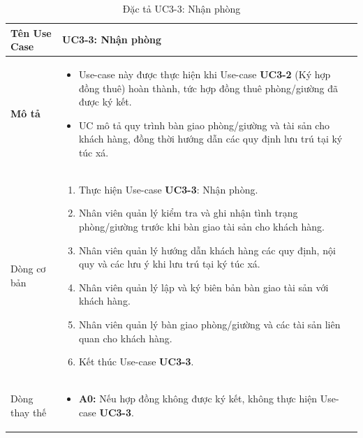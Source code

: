 \noindent
\begin{table}[H]
    \centering
\begin{tabularx}{\textwidth}{|>{\centering\arraybackslash\bfseries}m{3.5cm}|X|}
    \hline
    Tên Use Case & {\centering\textbf{UC3-3: Nhận phòng}\par} \\ 
    \hline

    Mô tả &
    \vspace{0.2cm}
    \begin{itemize}[leftmargin=*, nosep, label=-]
        \item Use-case này được thực hiện khi Use-case \textbf{UC3-2} (Ký hợp đồng thuê) hoàn thành, tức hợp đồng thuê phòng/giường đã được ký kết.
        \item UC mô tả quy trình bàn giao phòng/giường và tài sản cho khách hàng, đồng thời hướng dẫn các quy định lưu trú tại ký túc xá.
    \end{itemize} \\ 
    \hline

    Dòng cơ bản &
    \vspace{0.2cm}
    \begin{enumerate}[leftmargin=*, nosep]
        \item Thực hiện Use-case \textbf{UC3-3}: Nhận phòng.
        \item Nhân viên quản lý kiểm tra và ghi nhận tình trạng phòng/giường trước khi bàn giao tài sản cho khách hàng.
        \item Nhân viên quản lý hướng dẫn khách hàng các quy định, nội quy và các lưu ý khi lưu trú tại ký túc xá.
        \item Nhân viên quản lý lập và ký biên bản bàn giao tài sản với khách hàng.
        \item Nhân viên quản lý bàn giao phòng/giường và các tài sản liên quan cho khách hàng.
        \item Kết thúc Use-case \textbf{UC3-3}.
    \end{enumerate} \\ 
    \hline

    Dòng thay thế &
    \vspace{0.2cm}
    \begin{itemize}[leftmargin=*, nosep, label=-]
        \item \textbf{A0:} Nếu hợp đồng không được ký kết, không thực hiện Use-case \textbf{UC3-3}.
    \end{itemize} \\ 
    \hline
\end{tabularx}
\caption{Đặc tả UC3-3: Nhận phòng}
\end{table}


